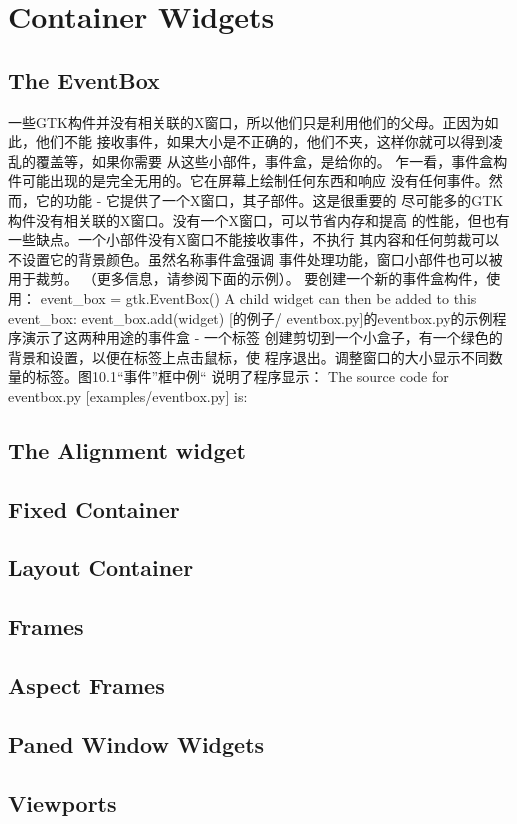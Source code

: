 \chapter{Container Widgets}
\section{The EventBox}
一些GTK构件并没有相关联的X窗口，所以他们只是利用他们的父母。正因为如此，他们不能
接收事件，如果大小是不正确的，他们不夹，这样你就可以得到凌乱的覆盖等，如果你需要
从这些小部件，事件盒，是给你的。
乍一看，事件盒构件可能出现的是完全无用的。它在屏幕上绘制任何东西和响应
没有任何事件。然而，它的功能 - 它提供了一个X窗口，其子部件。这是很重要的
尽可能多的GTK构件没有相关联的X窗口。没有一个X窗口，可以节省内存和提高
的性能，但也有一些缺点。一个小部件没有X窗口不能接收事件，不执行
其内容和任何剪裁可以不设置它的背景颜色。虽然名称事件盒强调
事件处理功能，窗口小部件也可以被用于裁剪。 （更多信息，请参阅下面的示例）。
要创建一个新的事件盒构件，使用：
event_box = gtk.EventBox()
A child widget can then be added to this event_box:
event_box.add(widget)
[的例子/ eventbox.py]的eventbox.py的示例程序演示了这两种用途的事件盒 - 一个标签
创建剪切到一个小盒子，有一个绿色的背景和设置，以便在标签上点击鼠标，使
程序退出。调整窗口的大小显示不同数量的标签。图10.1“事件”框中例“
说明了程序显示：	
The source code for eventbox.py [examples/eventbox.py] is:
\section{The Alignment widget}
\section{Fixed Container}
\section{Layout Container}
\section{Frames}
\section{Aspect Frames}
\section{Paned Window Widgets}
\section{Viewports}
